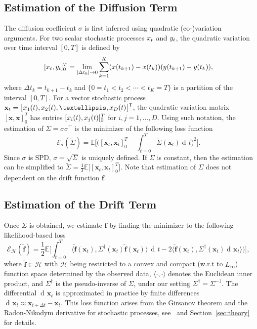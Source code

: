 \documentclass[11pt]{article} %
\def\rx{{\textnormal{x}}}
\def\ry{{\textnormal{y}}}
\def\rvx{{\mathbf{x}}}
\def\vf{{\bm{f}}}
\def\gH{{\mathcal{H}}}
\newcommand{\E}{\mathbb{E}}
\DeclareMathOperator{\dif}{d \!}        %
\newcommand{\loss}{\mathcal{E}}
\begin{document}
\subsection{Estimation of the Diffusion Term}
%
The diffusion coefficient $\sigma$ is first inferred using quadratic (co-)variation arguments.  For two scalar stochastic processes $\rx_t$ and $\ry_t$, the quadratic variation over time interval $[0, T]$ is defined by
\[
[\rx_t, \ry_t]_0^T = \lim_{|\Delta t_k| \to 0} \sum_{k= 1}^K (\rx(t_{k+1}) - \rx(t_k))(\ry(t_{k+1}) - \ry(t_k)),
\] 
where $\Delta t_k = t_{k + 1} - t_k$ and $\{0 = t_1 < t_2 < \cdots < t_K = T\}$ is a partition of the interval $[0, T]$.  For a vector stochastic process $\rvx_t = \begin{bmatrix}\rx_1(t), \rx_2(t), \ldots, \rx_D(t)\end{bmatrix}^\intercal $, the quadratic variation matrix $[\rvx,\rvx]_0^T$ has entries $[\rx_i(t), \rx_j(t)]_0^T$ for $i, j = 1, \ldots,D$.  Using such notation, the estimation of $\Sigma = \sigma\sigma^\intercal$ is the minimizer of the following loss function 
\begin{equation}\label{eq:sigma_loss}
\mathcal{E}_{\sigma}(\tilde \Sigma) = \E\Big[\big([\rvx_t, \rvx_t]_0^T - \int_{t=0}^T \tilde \Sigma(\rvx_t)\dif t\big)^2\Big].
\end{equation}
Since $\sigma$ is SPD, $\sigma = \sqrt{\Sigma}$ is uniquely defined. If $\Sigma$ is constant, then the estimation can be simplified to $\tilde \Sigma = \frac{1}{T}\mathbb{E}\big[[\rvx_t, \rvx_t]_0^T\big]$. Note that estimation of $\Sigma$ does not dependent on the drift function $\vf$.  
%
\subsection{Estimation of the Drift Term}
%
Once $\Sigma$ is obtained, we estimate $\vf$ by finding the minimizer to the following likelihood-based loss
\begin{equation}\label{eq:original_loss}
\loss_{\gH}(\tilde\vf) = \frac{1}{2}\E\Big[\int_{t = 0}^T\langle\tilde\vf(\rvx_t), \Sigma^{\dagger}(\rvx_t)\tilde\vf(\rvx_t)\rangle \, \dif t  - 2\langle\tilde\vf(\rvx_t), \Sigma^{\dagger}(\rvx_t)\dif \rvx_t\rangle\big)\Big],
\end{equation}
where $\tilde\vf \in \gH$ with $\gH$ being restricted to a convex and compact (w.r.t to $L_{\infty}$) function space determined by the observed data, $\langle\cdot,\cdot\rangle$ denotes the Euclidean inner product, and $\Sigma^\dagger$ is the pseudo-inverse of $\Sigma$, under our setting $\Sigma^\dagger = \Sigma^{-1}$.  The differential $\dif\rvx_t$ is approximated in practice by finite differences $\dif\rvx_t \approx \rvx_{t + \Delta t} - \rvx_t$.  This loss function arises from the Girsanov theorem and the Radon-Nikodym derivative for stochastic processes, see~\citep[Chpater~7]{liptser2001statistics} and Section~\ref{sec:theory} for details.  
%
\end{document}
